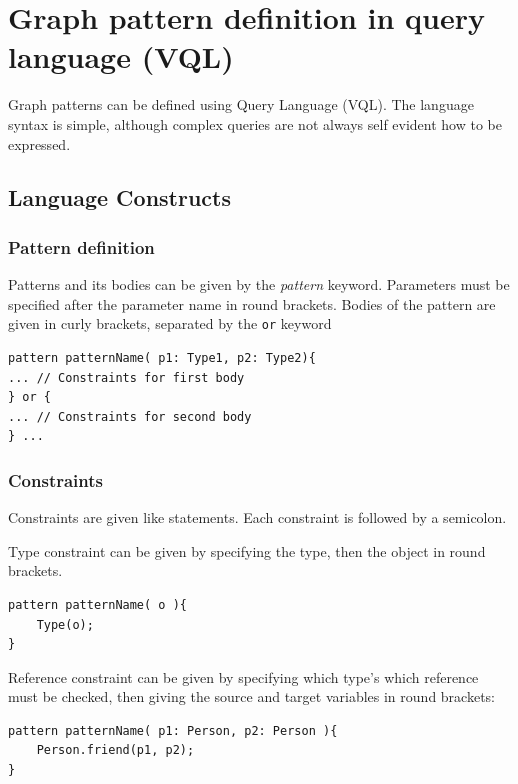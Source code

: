 \chapter{Graph pattern definition in \viatra{} query language (VQL)}

Graph patterns can be defined using \viatra{} Query Language (VQL). 
The language syntax is simple, although complex queries are not always self evident how to be expressed.

\section{ Language Constructs }

\subsection{Pattern definition}
Patterns and its bodies can be given by the \emph{pattern} keyword. 
Parameters must be specified after the parameter name in round brackets. 
Bodies of the pattern are given in curly brackets, separated by the \texttt{or} keyword

\begin{minipage}{\textwidth}
\begin{lstlisting}[language=vql]
pattern patternName( p1: Type1, p2: Type2){
... // Constraints for first body
} or {
... // Constraints for second body
} ...
\end{lstlisting}
\end{minipage}


\subsection{Constraints}
Constraints are given like statements. 
Each constraint is followed by a semicolon.

\vspace{\abovedisplayskip}
\begin{minipage}{\textwidth}
Type constraint can be given by specifying the type, then the object in round brackets.
\begin{lstlisting}[language=vql]
pattern patternName( o ){
	Type(o);
}
\end{lstlisting}
\end{minipage}
\vspace{\belowdisplayskip}

\begin{minipage}{\textwidth}
Reference constraint can be given by specifying which type's which reference must be checked, then giving the source and target variables in round brackets:
\begin{lstlisting}[language=vql]
pattern patternName( p1: Person, p2: Person ){
	Person.friend(p1, p2);
}
\end{lstlisting}
\end{minipage}
\vspace{\belowdisplayskip}

